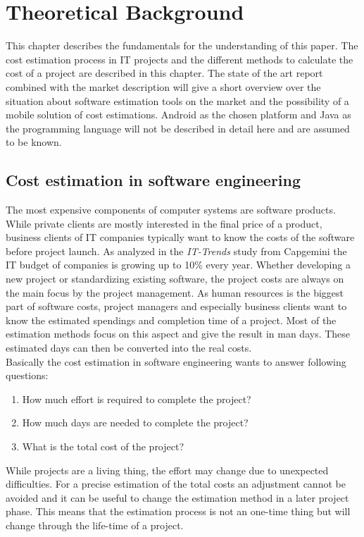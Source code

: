 \chapter{Theoretical Background}

This chapter describes the fundamentals for the understanding of this paper. The cost estimation process in IT projects and the different methods to calculate the cost of a project are described in this chapter. The state of the art report combined with the market description will give a short overview over the situation about software estimation tools on the market and the possibility of a mobile solution of cost estimations. Android as the chosen platform and Java as the programming language will not be described in detail here and are assumed to be known.

\section{Cost estimation in software engineering}

The most expensive components of computer systems are software products. While private clients are mostly interested in the final price of a product, business clients of IT companies typically want to know the costs of the software before project launch. As analyzed in the \textit{IT-Trends} study from Capgemini \cite{capgemini} the IT budget of companies is growing up to 10\% every year. Whether developing a new project or standardizing existing software, the project costs are always on the main focus by the project management. As human resources is the biggest part of software costs, project managers and especially business clients want to know the estimated spendings and completion time of a project. Most of the estimation methods focus on this aspect and give the result in man days. These estimated days can then be converted into the real costs.
\\
Basically the cost estimation in software engineering wants to answer following questions:
\begin{enumerate}
\item How much effort is required to complete the project?
\item How much days are needed to complete the project?
\item What is the total cost of the project?
\end{enumerate}
While projects are a living thing, the effort may change due to unexpected difficulties. For a precise estimation of the total costs an adjustment cannot be avoided and it can be useful to change the estimation method in a later project phase. This means that the estimation process is not an one-time thing but will change through the life-time of a project. 


